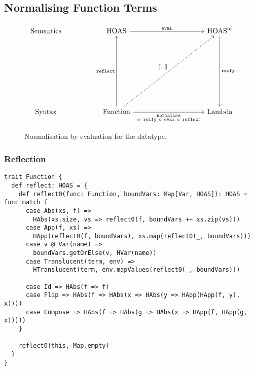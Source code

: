 \documentclass[../../main.tex]{subfiles}
\begin{document}
\subsection{Normalising Function Terms}
\begin{figure}[htbp]
\begin{equation*}
\begin{tikzcd}[sep=5em]
  \text{Semantics} & \text{HOAS} \arrow[rr, "\texttt{eval}"]                                                                                                                                         &  & \text{HOAS}^\text{nf} \arrow[dd, "\texttt{reify}"] \\
                   &                                                                                                                                                                                 &  &                                                    \\
  \text{Syntax}    & \text{Function} \arrow[uu, "\texttt{reflect}"] \arrow[rr, "\substack{\texttt{normalise} \\ =\ \texttt{reify}\ \circ\ \texttt{eval}\ \circ\ \texttt{reflect}}"'] \arrow[rruu, "{\text{\textlbrackdbl} - \text{\textrbrackdbl}}", dashed] &  & \text{Lambda}                                     
\end{tikzcd}
\end{equation*}
\caption{Normalisation by evaluation for the  datatype.}
\end{figure}

\subsubsection{Reflection}

\begin{verbatim}
trait Function {
  def reflect: HOAS = {
    def reflect0(func: Function, boundVars: Map[Var, HOAS]): HOAS = func match {
      case Abs(xs, f) =>
        HAbs(xs.size, vs => reflect0(f, boundVars ++ xs.zip(vs)))
      case App(f, xs) =>
        HApp(reflect0(f, boundVars), xs.map(reflect0(_, boundVars)))
      case v @ Var(name) =>
        boundVars.getOrElse(v, HVar(name))
      case Translucent(term, env) =>
        HTranslucent(term, env.mapValues(reflect0(_, boundVars)))

      case Id => HAbs(f => f)
      case Flip => HAbs(f => HAbs(x => HAbs(y => HApp(HApp(f, y), x))))
      case Compose => HAbs(f => HAbs(g => HAbs(x => HApp(f, HApp(g, x)))))
    }

    reflect0(this, Map.empty)
  }
}
\end{verbatim}
\end{document}
